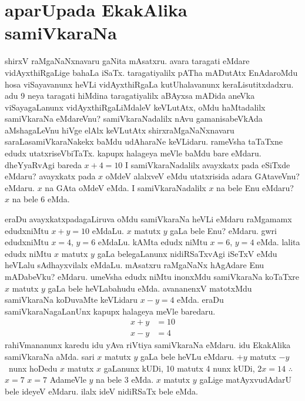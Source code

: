 \chapter{aparUpada EkakAlika samiVkaraNa}
\vskip -20pt

shirxV raMgaNaNxnavaru gaNita mAsatxru. avara taragati eMdare vidAyxthiRgaLige bahaLa iSaTx. taragatiyalilx pATha mADutAtx EnAdaroMdu hosa viSayavanunx heVLi vidAyxthiRgaLa kutUhalavanunx keraLisutitxdadxru. adu {\rm 9} neya taragati hiMdina taragatiyalilx aBAyxsa mADida aneVka viSayagaLanunx vidAyxthiRgaLiMdaleV keVLutAtx, oMdu haMtadalilx samiVkaraNa eMdareVnu? samiVkaraNadalilx nAvu gamanisabeVkAda aMshagaLeVnu hiVge elAlx keVLutAtx shirxraMgaNaNxnavaru saraLasamiVkaraNakekx baMdu udAharaNe keVLidaru. rameVsha taTaTxne edudx utatxriseVbiTaTx. kapupx halageya meVle baMdu bare eMdaru. dheYyaRvAgi bareda $x+4=10$ I samiVkaraNadalilx avayxkatx pada eSiTxde eMdaru? avayxkatx pada $x$ oMdeV alalxveV eMdu utatxrisida adara GAtaveVnu? eMdaru. $x$ na GAta oMdeV eMda. I samiVkaraNadalilx $x$ na bele Enu eMdaru? $x$ na bele {\rm 6} eMda.

eraDu avayxkatxpadagaLiruva oMdu samiVkaraNa heVLi eMdaru raMgamamx edudxniMtu $x+y=10$ eMdaLu. $x$ matutx $y$ gaLa bele Enu? eMdaru. gwri edudxniMtu $x=4$, $y=6$ eMdaLu. kAMta edudx niMtu $x=6$, $y=4$ eMda. lalita edudx niMtu \;$x$\; matutx $y$ gaLa belegaLanunx nidiRSaTxvAgi iSeTxV eMdu heVLalu sAdhayxvilalx eMdaLu. mAsatxru raMgaNaNx hAgAdare Enu mADabeVku? eMdaru. umeVsha edudx niMtu inonxMdu samiVkaraNa koTaTxre $x$ matutx $y$ gaLa bele heVLabahudu eMda. avananenxV matotxMdu samiVkaraNa koDuvaMte keVLidaru $x-y=4$ eMda. eraDu samiVkaraNagaLanUnx kapupx halageya meVle baredaru.
\begin{align*}
x+y &=10\\
x-y &=4
\end{align*}
rahiVmananunx karedu idu yAva riVtiya samiVkaraNa eMdaru. idu EkakAlika samiVkaraNa aMda. sari $x$ matutx $y$ gaLa bele heVLu eMdaru. $+y$ matutx $-y$~nunx hoDedu $x$ matutx $x$ gaLanunx kUDi, {\rm 10} matutx {\rm 4} nunx kUDi, $2x=14$\; $\therefore$ $x=7$  $x=7$  AdameVle $y$ na bele {\rm 3} eMda. $x$ matutx $y$ gaLige matAyxvudAdarU bele ideyeV eMdaru. ilalx ideV nidiRSaTx bele eMda.

